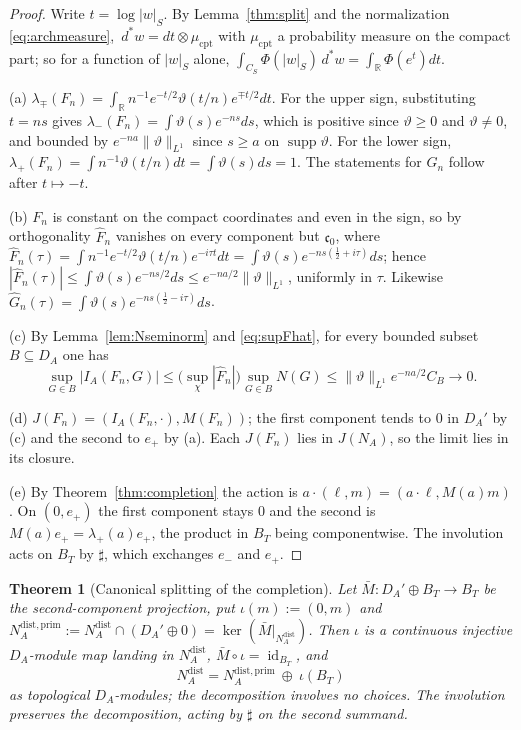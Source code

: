 \documentclass[11pt]{amsart}
\newtheorem{theorem}{Theorem}[section]
\theoremstyle{definition}
\theoremstyle{remark}
\newcommand{\R}{\mathbb R}
\newcommand{\dstar}{\,d^{*}}
\newcommand{\supp}{\operatorname{supp}}
\newcommand{\id}{\operatorname{id}}
\newcommand{\DA}{D_A}
\newcommand{\BT}{B_T}
\newcommand{\NAd}{N_A^{\mathrm{dist}}}
\begin{document}
\begin{proof}
Write $t=\log|w|_S$.  By Lemma~\ref{thm:split} and the normalization
\eqref{eq:archmeasure}, $\dstar w=dt\otimes\mu_{\mathrm{cpt}}$ with
$\mu_{\mathrm{cpt}}$ a probability measure on the compact part; so for a
function of $|w|_S$ alone,
$\int_{C_S}\Phi(|w|_S)\dstar w=\int_{\R}\Phi(e^{t})dt$.

(a)  $\lambda_{\mp}(F_n)=\int_{\R}n^{-1}e^{-t/2}\vartheta(t/n)e^{\mp t/2}dt$.  For
the upper sign, substituting $t=ns$ gives
$\lambda_-(F_n)=\int\vartheta(s)e^{-ns}ds$, which is positive since $\vartheta\ge0$ and
$\vartheta\ne0$, and bounded by $e^{-na}\lVert\vartheta\rVert_{L^1}$ since $s\ge a$ on
$\supp\vartheta$.  For the lower sign,
$\lambda_+(F_n)=\int n^{-1}\vartheta(t/n)dt=\int\vartheta(s)ds=1$.  The statements for
$G_n$ follow after $t\mapsto-t$.

(b)  $F_n$ is constant on the compact coordinates and even in the sign, so by
orthogonality $\widehat F_n$ vanishes on every component but $\mathfrak c_0$,
where
$\widehat F_n(\tau)=\int n^{-1}e^{-t/2}\vartheta(t/n)e^{-i\tau t}dt=
\int\vartheta(s)e^{-ns(\frac12+i\tau)}ds$; hence $|\widehat F_n(\tau)|\le
\int\vartheta(s)e^{-ns/2}ds\le e^{-na/2}\lVert\vartheta\rVert_{L^1}$, uniformly in
$\tau$.  Likewise $\widehat G_n(\tau)=\int\vartheta(s)e^{-ns(\frac12-i\tau)}ds$.

(c)  By Lemma~\ref{lem:Nseminorm} and \eqref{eq:supFhat}, for every bounded
subset $B\subseteq\DA$ one has
\[
\sup_{G\in B}|I_A(F_n,G)|\le\bigl(\sup_{\chi}|\widehat F_n|\bigr)
\sup_{G\in B}N(G)\le\lVert\vartheta\rVert_{L^1}e^{-na/2}C_B\longrightarrow0 .
\]

(d)  $J(F_n)=(I_A(F_n,\cdot),M(F_n))$; the first component tends to $0$ in
$\DA'$ by (c) and the second to $e_+$ by (a).  Each $J(F_n)$ lies in $J(N_A)$,
so the limit lies in its closure.

(e)  By Theorem~\ref{thm:completion} the action is
$a\cdot(\ell,m)=(a\cdot\ell,M(a)m)$.  On $(0,e_+)$ the first component stays
$0$ and the second is $M(a)e_+=\lambda_+(a)e_+$, the product in $\BT$ being
componentwise.  The involution acts on $\BT$ by $\sharp$, which exchanges $e_-$
and $e_+$.
\end{proof}

\begin{theorem}[Canonical splitting of the completion]\label{thm:splitting}
Let $\bar M:\DA'\oplus\BT\to\BT$ be the second-component projection, put
$\iota(m):=(0,m)$ and
$N_A^{\mathrm{dist,prim}}:=\NAd\cap(\DA'\oplus0)=\ker(\bar M|_{\NAd})$.  Then $\iota$ is
a continuous injective $\DA$-module map landing in $\NAd$, $\bar M\circ
\iota=\id_{\BT}$, and
\begin{equation}\label{eq:split}
\NAd=N_A^{\mathrm{dist,prim}}\ \oplus\ \iota(\BT)
\end{equation}
as topological $\DA$-modules; the decomposition involves no choices.  The involution
preserves the decomposition, acting by $\sharp$ on the second summand.
\end{theorem}
\end{document}
